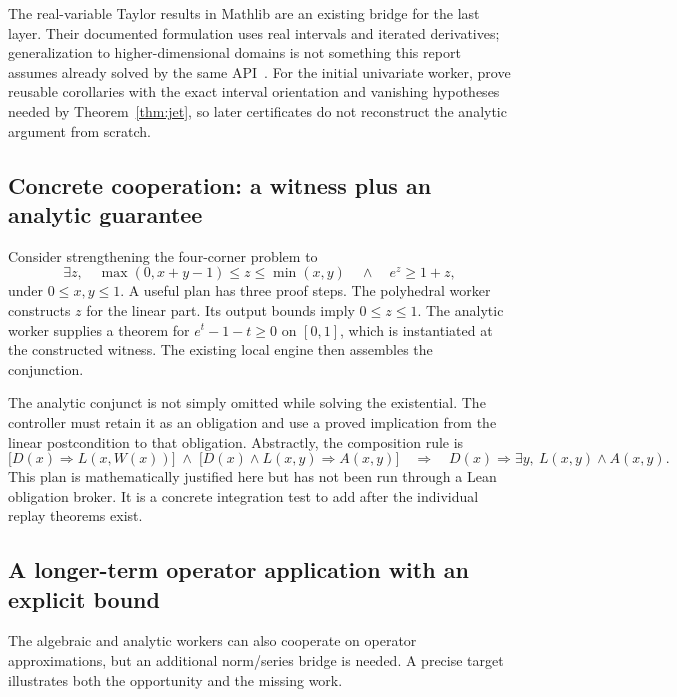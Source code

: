 The real-variable Taylor results in Mathlib are an existing bridge for the last layer. Their documented formulation uses real intervals and iterated derivatives; generalization to higher-dimensional domains is not something this report assumes already solved by the same API~\cite{mathlib-taylor}. For the initial univariate worker, prove reusable corollaries with the exact interval orientation and vanishing hypotheses needed by Theorem~\ref{thm:jet}, so later certificates do not reconstruct the analytic argument from scratch.

\subsection{Concrete cooperation: a witness plus an analytic guarantee}
Consider strengthening the four-corner problem to
\[
 \exists z,\quad
 \max(0,x+y-1)\le z\le\min(x,y)
 \quad\land\quad e^z\ge1+z,
\]
under \(0\le x,y\le1\). A useful plan has three proof steps. The polyhedral worker constructs \(z\) for the linear part. Its output bounds imply \(0\le z\le1\). The analytic worker supplies a theorem for \(e^t-1-t\ge0\) on \([0,1]\), which is instantiated at the constructed witness. The existing local engine then assembles the conjunction.

The analytic conjunct is not simply omitted while solving the existential. The controller must retain it as an obligation and use a proved implication from the linear postcondition to that obligation. Abstractly, the composition rule is
\[
 \bigl[D(x)\Rightarrow L(x,W(x))\bigr]
 \;\land\;
 \bigl[D(x)\land L(x,y)\Rightarrow A(x,y)\bigr]
 \quad\Longrightarrow\quad
 D(x)\Rightarrow\exists y,\ L(x,y)\land A(x,y).
\]
This plan is mathematically justified here but has not been run through a Lean obligation broker. It is a concrete integration test to add after the individual replay theorems exist.

\subsection{A longer-term operator application with an explicit bound}
The algebraic and analytic workers can also cooperate on operator approximations, but an additional norm/series bridge is needed. A precise target illustrates both the opportunity and the missing work.

